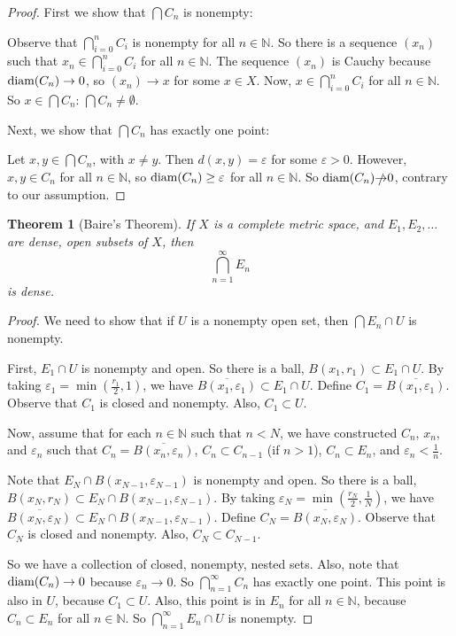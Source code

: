 \documentclass{amsart}
\newcommand{\vep}{\varepsilon}
\newcommand{\N}{\mathbb{N}}
\newcommand{\diam}{\text{\rm diam}}
\newtheorem{thm}{Theorem}[section]
\theoremstyle{definition}
\begin{document}
\begin{proof}
First we show that $\bigcap C_n$ is nonempty: 

Observe that $\bigcap\limits_{i=0}^n C_i$ is nonempty for all $n \in \N$. 
So there is a sequence $(x_n)$ such that $x_n \in \bigcap\limits_{i=0}^n C_i$ for all $n \in \N$. 
The sequence $(x_n)$ is Cauchy because $\diam(C_n) \to 0$, so $(x_n) \to x$ for some $x \in X$.
Now, $x \in \bigcap\limits_{i=0}^n C_i$ for all $n \in \N$.
So $x \in \bigcap C_n$: $\bigcap C_n \neq \emptyset$.

Next, we show that $\bigcap C_n$ has exactly one point:

Let $x, y \in \bigcap C_n$, with $x \neq y$. 
Then $d(x,y) = \vep$ for some $\vep >0$. 
However, $x,y \in C_n$ for all $n \in \N$,
so $\diam(C_n) \geq \vep$ for all $n \in \N$. 
So $\diam(C_n) \slashed{\to} 0$, contrary to our assumption.
\end{proof}

\begin{thm}[Baire's Theorem]If $X$ is a complete metric space, and $E_1, E_2, \ldots$ are dense, open subsets of $X$, then
\begin{displaymath}
\bigcap\limits_{n = 1}^{\infty} E_n
\end{displaymath}
is dense.
\end{thm}

\begin{proof}
We need to show that if $U$ is a nonempty open set, then $\bigcap E_n \cap U$ is nonempty.

First, $E_1 \cap U$ is nonempty and open.
So there is a ball, $B(x_1,r_1) \subset E_1 \cap U$.
By taking $\vep_1 = \min(\frac{r_1}{2},1)$, we have $\overline{B(x_1,\vep_1)} \subset E_1 \cap U$.
Define $C_1 = \overline{B(x_1,\vep_1)}$.
Observe that $C_1$ is closed and nonempty. Also, $C_1 \subset U$.

Now, assume that for each $n \in \N$ such that $n < N$, we have constructed $C_{n}$, $x_{n}$, and $\vep_{n}$ such that $C_{n} = \overline{B(x_{n},\vep_{n})}$, $C_n \subset C_{n-1}$ (if $n >1$), $C_{n} \subset E_{n}$, and $\vep_{n} < \frac{1}{n}$.

Note that $E_N \cap B(x_{N-1},\vep_{N-1})$ is nonempty and open.
So there is a ball, $B(x_N,r_N) \subset E_N \cap B(x_{N-1},\vep_{N-1})$.
By taking $\vep_N = \min(\frac{r_N}{2},\frac{1}{N})$, we have $\overline{B(x_N,\vep_N)} \subset E_N \cap B(x_{N-1},\vep_{N-1})$.
Define $C_N = \overline{B(x_N,\vep_N)}$.
Observe that $C_N$ is closed and nonempty. Also, $C_N \subset C_{N-1}$.

So we have a collection of closed, nonempty, nested sets.
Also, note that $\diam(C_n) \to 0$ because $\vep_n \to 0$. 
So $\bigcap\limits_{n=1}^\infty C_n$ has exactly one point.
This point is also in $U$, because $C_1 \subset U$.
Also, this point is in $E_n$ for all $n \in \N$, because $C_n \subset E_n$ for all $n \in \N$.
So $\bigcap\limits_{n=1}^\infty E_n \cap U$ is nonempty.

\end{proof}
\end{document}
